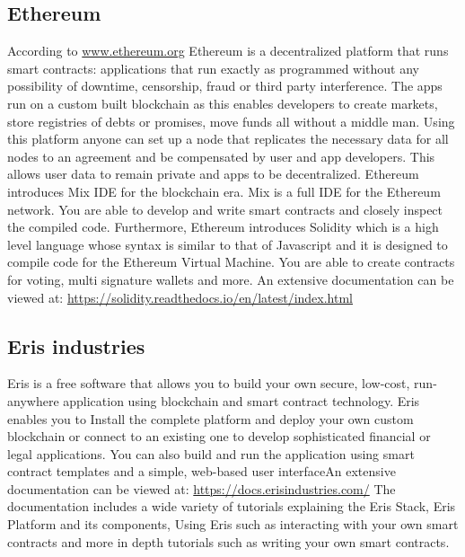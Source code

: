 \documentclass[12pt]{article}
\begin{document}
\subsection{Ethereum}
According to \url{www.ethereum.org} Ethereum is a decentralized platform that runs smart contracts: applications that run exactly as programmed without any possibility of downtime, censorship, fraud or third party interference. The apps run on a custom built blockchain as this enables developers to create markets, store registries of debts or promises, move funds all without a middle man. Using this platform anyone can set up a node that replicates the necessary data for all nodes to an agreement and be compensated by user and app developers. This allows user data to remain private and apps to be decentralized. 
\newline
\newline
Ethereum introduces Mix IDE for the blockchain era. Mix is a full IDE for the Ethereum network. You are able to develop and write smart contracts and closely inspect the compiled code. Furthermore, Ethereum introduces Solidity which is a high level language whose syntax is similar to that of Javascript and it is designed to compile code for the Ethereum Virtual Machine. You are able to create contracts for voting, multi signature wallets and more. An extensive documentation can be viewed at: \url{https://solidity.readthedocs.io/en/latest/index.html}

\subsection{Eris industries}
Eris is a free software that allows you to build your own secure, low-cost, run-anywhere application using blockchain and smart contract technology. Eris enables you to Install the complete platform and deploy your own custom blockchain or connect to an existing one to develop sophisticated financial or legal applications. You can also build and run the application using smart contract templates and a simple, web-based user interfaceAn extensive documentation can be viewed at: \url{https://docs.erisindustries.com/}
\newline
\newline
The documentation includes a wide variety of tutorials explaining the Eris Stack, Eris Platform and its components, Using Eris such as interacting with your own smart contracts and more in depth tutorials such as writing your own smart contracts. 
\end{document}

